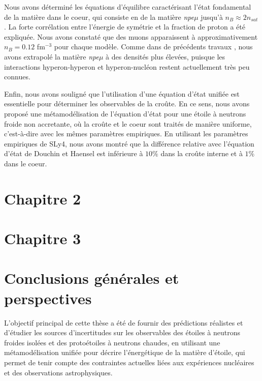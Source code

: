 Nous avons déterminé les équations d'équilibre caractérisant l'état fondamental 
de la matière dans le coeur, qui consiste en de la matière \textit{npe$\mu$} 
jusqu'à $n_B\approx 2n_{sat}$. La forte corrélation entre l'énergie de symétrie 
et la fraction de proton a été expliquée. 
Nous avons constaté que des muons apparaissent à approximativement 
$n_B = 0.12$ fm$^{-3}$ pour chaque modèle. Comme dans de précédents travaux 
\cite{Wiringa1988,Douchin2001}, nous avons extrapolé la matière 
\textit{npe$\mu$} à des densités plus élevées, puisque les interactions 
hyperon-hyperon et hyperon-nucléon restent actuellement très peu connues.

Enfin, nous avons souligné que l'utilisation d'une équation d'état unifiée 
est essentielle pour déterminer les observables de la croûte. En ce sens, nous 
avons proposé une métamodélisation de l'équation d'état pour une étoile à 
neutrons froide non accretante, où la croûte et le coeur sont traités de 
manière uniforme, c'est-à-dire avec les mêmes paramètres empiriques. 
En utilisant les paramètres empiriques de SLy4, nous avons montré que la 
différence relative avec l'équation d'état de Douchin et Haensel est inférieure 
à $10\%$ dans la croûte interne et à $1\%$ dans le coeur.

\section{Chapitre 2}

\section{Chapitre 3}

\section{Conclusions générales et perspectives}

L'objectif principal de cette thèse a été de fournir des prédictions réalistes 
et d'étudier les sources d'incertitudes sur les observables des étoiles à 
neutrons froides isolées et des protoétoiles à neutrons chaudes, en utilisant 
une métamodélisation unifiée pour décrire l'énergétique de la matière d'étoile, 
qui permet de tenir compte des contraintes actuelles liées aux expériences 
nucléaires et des observations astrophysiques.
\\

